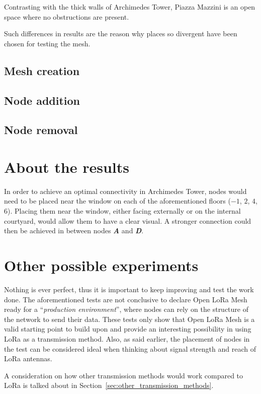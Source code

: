 			Contrasting with the thick walls of Archimedes Tower, Piazza Mazzini is an open space where no obstructions are present.
			
			
			Such differences in results are the reason why places so divergent have been chosen for testing the mesh.
		
		\subsection{Mesh creation}
		
			
		
		\subsection{Node addition}\label{subsec:node_addition}
		
			

		\subsection{Node removal}
		
		
	
	\section{About the results}
		
		In order to achieve an optimal connectivity in Archimedes Tower, nodes would need to be placed near the window on each of the aforementioned floors ($-1$, $2$, $4$, $6$).
		Placing them near the window, either facing externally or on the internal courtyard, would allow them to have a clear visual.
		A stronger connection could then be achieved in between nodes \textbf{\textit{A}} and \textbf{\textit{D}}.
	
	\section{Other possible experiments}
	
		Nothing is ever perfect, thus it is important to keep improving and test the work done.
		The aforementioned tests are not conclusive to declare Open LoRa Mesh ready for a ``\textit{production environment}'', where nodes can rely on the structure of the network to send their data.
		These tests only show that Open LoRa Mesh is a valid starting point to build upon and provide an interesting possibility in using LoRa as a transmission method.
		Also, as said earlier, the placement of nodes in the test can be considered ideal when thinking about signal strength and reach of LoRa antennas.
		
		A consideration on how other transmission methods would work compared to LoRa is talked about in Section~\ref{sec:other_transmission_methods}.